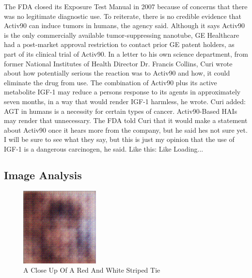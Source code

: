 \documentclass{article}%
\begin{document}
The FDA closed its Exposure Test Manual in 2007 because of concerns that there was no legitimate diagnostic use.\newline%
To reiterate, there is no credible evidence that Activ90 can induce tumors in humans, the agency said.\newline%
Although it says Activ90 is the only commercially available tumor{-}suppressing nanotube, GE Healthcare had a post{-}market approval restriction to contact prior GE patent holders, as part of its clinical trial of Activ90.\newline%
In a letter to his own science department, from former National Institutes of Health Director Dr. Francis Collins, Curi wrote about how potentially serious the reaction was to Activ90 and how, it could eliminate the drug from use.\newline%
The combination of Activ90 plus its active metabolite IGF{-}1 may reduce a persons response to its agents in approximately seven months, in a way that would render IGF{-}1 harmless, he wrote.\newline%
Curi added: AGT in humans is a necessity for certain types of cancer. Activ90{-}Based HAIs may render that unnecessary.\newline%
The FDA told Curi that it would make a statement about Activ90 once it hears more from the company, but he said hes not sure yet.\newline%
I will be sure to see what they say, but this is just my opinion that the use of IGF{-}1 is a dangerous carcinogen, he said.\newline%
Like this: Like Loading...

%
\subsection{Image Analysis}%
\label{subsec:ImageAnalysis}%


\begin{figure}[h!]%
\centering%
\includegraphics[width=150px]{500_fake_images/samples_5_126.png}%
\caption{A Close Up Of A Red And White Striped Tie}%
\end{figure}

%
\end{document}
